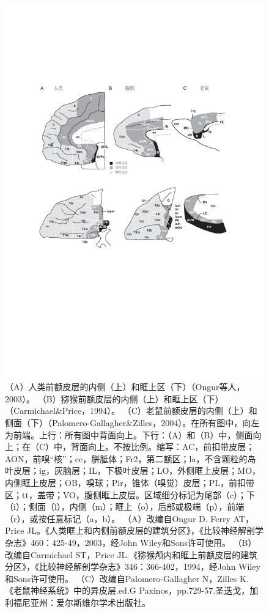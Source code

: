 \begin{figure}[!htb]
	\centering
	\includegraphics[width=0.8\linewidth]{image_pfc/Fig_2_1}
	\caption{（A）人类前额皮层的内侧（上）和眶上区（下）（Ongur等人，2003）。 （B）猕猴前额皮层的内侧（上）和眶上区（下）（Carmichael\&Price，1994）。 （C）老鼠前额皮层的内侧（上）和侧面（下）（Palomero-Gallagher\&Zilles，2004）。在所有图中，向左为前端。上行：所有图中背面向上。下行：（A）和（B）中，侧面向上；在（C）中，背面向上。不按比例。缩写：AC，前扣带皮层；AON，前嗅“核”；cc，胼胝体；Fr2，第二额区；la，不含颗粒的岛叶皮层；ig，灰脑层；IL，下极叶皮层；LO，外侧眶上皮层；MO，内侧眶上皮层；OB，嗅球；Pir，锥体（嗅觉）皮层；PL，前扣带区；tt，盖带；VO，腹侧眶上皮层。区域细分标记为尾部（c）；下（i）；侧面（l），内侧（m）；眶上（o），后部或极端（p），前端（r），或按任意标记（a，b）。 （A）改编自Ongur D. Ferry AT，Price JL。《人类眶上和内侧前额皮层的建筑分区》，《比较神经解剖学杂志》460：425-49，2003，经John Wiley和Sons许可使用。 （B）改编自Carmichael ST，Price JL.《猕猴颅内和眶上前额皮层的建筑分区》，《比较神经解剖学杂志》346：366-402，1994，经John Wiley和Sons许可使用。 （C）改编自Palomero-Gallagher N，Zilles K.《老鼠神经系统》中的异皮层.ed.G Paxinos，pp.729-57.圣迭戈，加利福尼亚州：爱尔斯维尔学术出版社。\label{fig:fig_2_1}}
\end{figure}

